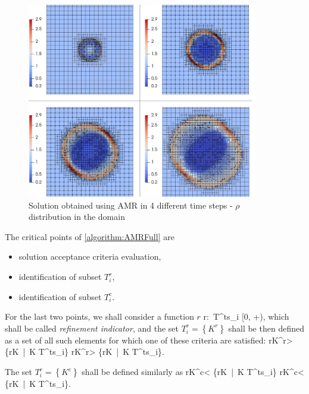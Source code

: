 \begin{figure}[H]
	\begin{center}
		\includegraphics[width=0.9\textwidth]{img/adapt/timedep/a.jpg}
		\caption{Solution obtained using AMR in 4 different time steps - $\rho$ distribution in the domain}
	\label{figure:amrTimedep}
	\end{center}
\end{figure}
\vspace{-4mm}

The critical points of \cref{algorithm:AMRFull} are
\begin{itemize}
\item solution acceptance criteria evaluation,
\item identification of subset $T^{r}_i$,
\item identification of subset $T^{c}_i$.
\end{itemize}
For the last two points, we shall consider a function $r$
\be
\label{refinementIndicator}
r:\ T^{ts}_i \rightarrow [0, +\infty),
\ee
which shall be called \textit{refinement indicator}, and the set $T^{r}_i = \left\{K^{r}\right\}$ shall be then defined as a set of all such elements for which one of these criteria are satisfied:
\be
	\label{refIndicatorValues}
	r\lo K^{r}\ro > \alpha \cdot \max\left\{r\lo K\ro\ |\ K \in T^{ts}_i\right\} 
\ee
\be
	r\lo K^{r}\ro > \beta \cdot \sum\left\{r\lo K\ro\ |\ K \in T^{ts}_i\right\}.
\ee

The set $T^{c}_i = \left\{K^{c}\right\}$ shall be defined similarly as
\be
	r\lo K^{c}\ro < \gamma \cdot \max\left\{r\lo K\ro\ |\ K \in T^{ts}_i\right\} 
\ee
\be
	\label{refIndicatorValuesEnd}
	r\lo K^{c}\ro < \delta \cdot \sum\left\{r\lo K\ro\ |\ K \in T^{ts}_i\right\}.
\ee

